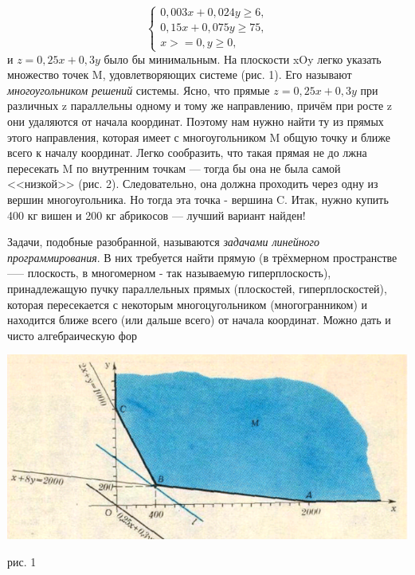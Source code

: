 \documentclass{article}
\begin{document}
\begin{multicols}{2}
\begin{equation}
    \begin{cases}
        0,003x+0,024y\geq6,
        \\
        0,15x+0,075y\geq75,
        \\
        x>=0, y\geq0,
    \end{cases}
\end{equation}
и $z=0,25 x+0,3 y$ было бы минимальным. На плоскости xOy легко указать множество точек M, удовлетворяющих системе (рис. 1). Его называют \textit{многоугольником решений} системы. Ясно, что прямые $z=0,25 x+0,3 y$ при различных z параллельны одному и тому же направлению, причём при росте z они удаляются от начала координат. Поэтому нам нужно найти ту из прямых этого направления, которая имеет с многоугольником M общую точку и ближе всего к началу координат. Легко сообразить, что такая прямая не до лжна пересекать M по внутренним точкам --- тогда бы она не была самой <<низкой>> (рис. 2). Следовательно, она должна проходить через одну из вершин многоугольника. Но тогда эта точка - вершина C. Итак, нужно купить 400 кг вишен и 200 кг абрикосов --- лучший вариант найден!\\
\par

\begin{scriptsize}
    Задачи, подобные разобранной, называются \textit{задачами линейного программирования}. В них требуется найти прямую (в трёхмерном пространстве ----- плоскость, в многомерном - так называемую гиперплоскость), принадлежащую пучку параллельных прямых (плоскостей, гиперплоскостей), которая пересекается с некоторым многоцугольником (многогранником) и находится ближе всего (или дальше всего) от начала координат. Можно дать и чисто алгебраическую фор 
\end{scriptsize}
\end{multicols}
\begin{center}
    \includegraphics[width=1\textwidth]{./images/graphic1.png}
    \caption{рис. 1}
\end{center}
\end{document}
